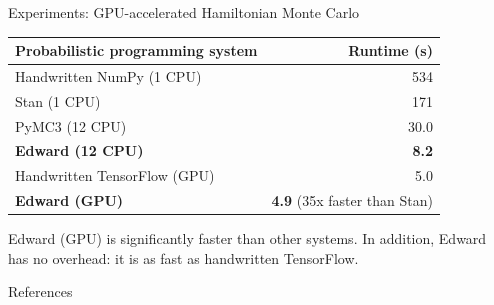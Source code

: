 \documentclass[final]{beamer}
\begin{document}
\begin{frame}[t]
\begin{columns}[t]
\begin{column}{\onecolwid}
\begin{block}{Experiments: GPU-accelerated Hamiltonian Monte Carlo}
\begin{table}[tb]
\centering
\begin{tabular}{lr}
\toprule
Probabilistic programming system & Runtime (s)
\\
\midrule
Handwritten NumPy (1 CPU) & 534 \\
Stan (1 CPU) & 171 \\
PyMC3 (12 CPU) & 30.0 \\
\textbf{Edward (12 CPU)} & \textbf{8.2} \\
Handwritten TensorFlow (GPU) & 5.0 \\
\textbf{Edward (GPU)} & \textbf{4.9} (35x faster than Stan)\\
\bottomrule
\end{tabular}
\end{table}

\vspace{1ex}
Edward (GPU) is significantly faster than other systems. In addition,
Edward has no overhead: it is as fast as handwritten TensorFlow.
\end{block}

\vspace{-2ex}
\begin{block}{References}
\small{
\vspace{0.75in}}
\end{block}

\end{column}

\begin{column}{\sepwid}\end{column} %

\end{columns} %
\end{frame}   %
\end{document}
